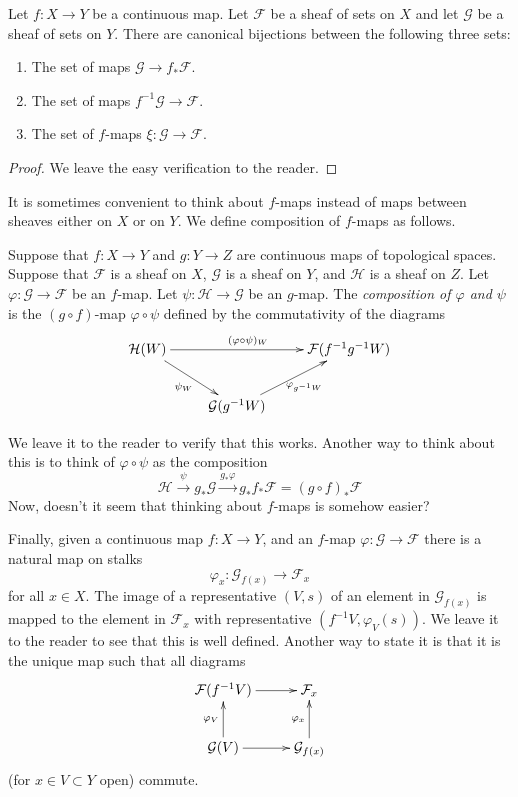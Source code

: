 \begin{lemma}
\label{lemma-f-map}
Let $f : X \to Y$ be a continuous map.
Let $\mathcal{F}$ be a sheaf of sets on $X$ and
let $\mathcal{G}$ be a sheaf of sets on $Y$.
There are canonical bijections between the following three sets:
\begin{enumerate}
\item The set of maps $\mathcal{G} \to f_*\mathcal{F}$.
\item The set of maps $f^{-1}\mathcal{G} \to \mathcal{F}$.
\item The set of $f$-maps $\xi : \mathcal{G} \to \mathcal{F}$.
\end{enumerate}
\end{lemma}

\begin{proof}
We leave the easy verification to the reader.
\end{proof}

\noindent
It is sometimes convenient to think about $f$-maps
instead of maps between sheaves either on $X$ or on $Y$.
We define composition of $f$-maps as follows.

\begin{definition}
\label{definition-composition-f-maps}
Suppose that $f : X \to Y$ and $g : Y \to Z$ are continuous
maps of topological spaces. Suppose that $\mathcal{F}$ is
a sheaf on $X$, $\mathcal{G}$ is a sheaf on $Y$, and
$\mathcal{H}$ is a sheaf on $Z$.
Let $\varphi : \mathcal{G} \to \mathcal{F}$ be an $f$-map.
Let $\psi : \mathcal{H} \to \mathcal{G}$ be an $g$-map.
The {\it composition of $\varphi$ and $\psi$} is the
$(g \circ f)$-map $\varphi \circ \psi$ defined
by the commutativity of the diagrams
$$
\xymatrix{
\mathcal{H}(W) \ar[rr]^{(\varphi \circ \psi)_W}
\ar[rd]_{\psi_W} & &
\mathcal{F}(f^{-1}g^{-1}W) \\
&
\mathcal{G}(g^{-1}W)
\ar[ru]_{\varphi_{g^{-1}W}}
}
$$
\end{definition}

\noindent
We leave it to the reader to verify that this works.
Another way to think about this is to think of
$\varphi \circ \psi$ as the composition
$$
\mathcal{H}
\xrightarrow{\psi}
g_*\mathcal{G}
\xrightarrow{g_*\varphi}
g_* f_* \mathcal{F} = (g \circ f)_* \mathcal{F}
$$
Now, doesn't it seem that thinking about $f$-maps is somehow
easier?

\medskip\noindent
Finally, given a continuous map $f : X \to Y$, and an
$f$-map $\varphi : \mathcal{G} \to \mathcal{F}$ there is
a natural map on stalks
$$
\varphi_x : \mathcal{G}_{f(x)} \longrightarrow \mathcal{F}_x
$$
for all $x \in X$. The image of a representative $(V, s)$
of an element in $\mathcal{G}_{f(x)}$ is mapped to the
element in $\mathcal{F}_x$ with representative $(f^{-1}V,
\varphi_V(s))$. We leave it to the reader to see that this
is well defined. Another way to state it is that it is the
unique map such that all diagrams
$$
\xymatrix{
\mathcal{F}(f^{-1}V) \ar[r] &
\mathcal{F}_{x} \\
\mathcal{G}(V) \ar[r] \ar[u]^{\varphi_V} &
\mathcal{G}_{f(x)} \ar[u]^{\varphi_x}
}
$$
(for $x \in V \subset Y$ open) commute.

